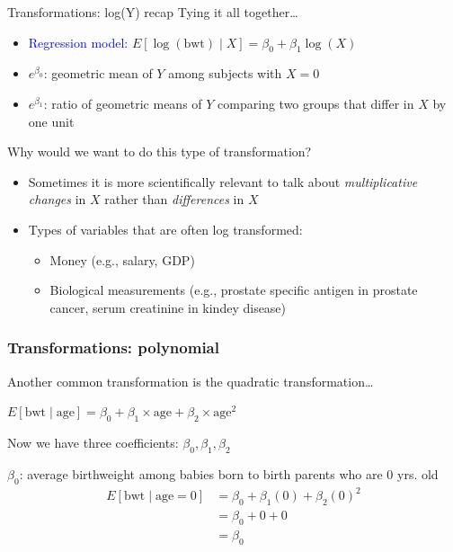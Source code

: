 \documentclass[10pt,t]{beamer}
\begin{document}
\begin{frame}{Transformations: log(Y) recap}
Tying it all together\dots

\vspace{0.3cm}

\begin{itemize}
	\item \textcolor{blue}{Regression model:} $E[\log(\text{bwt}) \mid X] = \beta_0 + \beta_1 \log(X)$
	\item \color{blue} $e^{\beta_0}$\color{black}: geometric mean of $Y$ among subjects with $X = 0$
	\item \color{blue}$e^{\beta_1}$\color{black}: ratio of geometric means of $Y$ comparing two groups that differ in $X$ by one unit
\end{itemize} \pause

\vspace{0.3cm}

Why would we want to do this type of transformation?

\begin{itemize}
	\item Sometimes it is more scientifically relevant to talk about \textit{multiplicative changes} in $X$ rather than \textit{differences} in $X$
	\item Types of variables that are often log transformed:
	\begin{itemize}
		\item Money (e.g., salary, GDP)
		\item Biological measurements (e.g., prostate specific antigen in prostate cancer, serum creatinine in kindey disease)
	\end{itemize}
\end{itemize}
\end{frame}

\begin{frame}
\frametitle{Transformations: polynomial}
Another common transformation is the quadratic transformation\dots
\begin{center} $E[\text{bwt} \mid \text{age}] = \beta_0 + \beta_1 \times \text{age} + \beta_2 \times \text{age}^2$ \end{center}

Now we have three coefficients: $\beta_0, \beta_1, \beta_2$\pause

\vspace{0.3cm}

\color{blue} $\beta_0$: average birthweight among babies born to birth parents who are 0 yrs. old \color{black} \pause
\begin{align*}
E[\text{bwt} \mid \text{age} = 0] & = \beta_0 + \beta_1 (0) + \beta_2(0)^2 \\
& = \beta_0 + 0 + 0 \\
& = \beta_0
\end{align*}
\end{frame}
\end{document}
